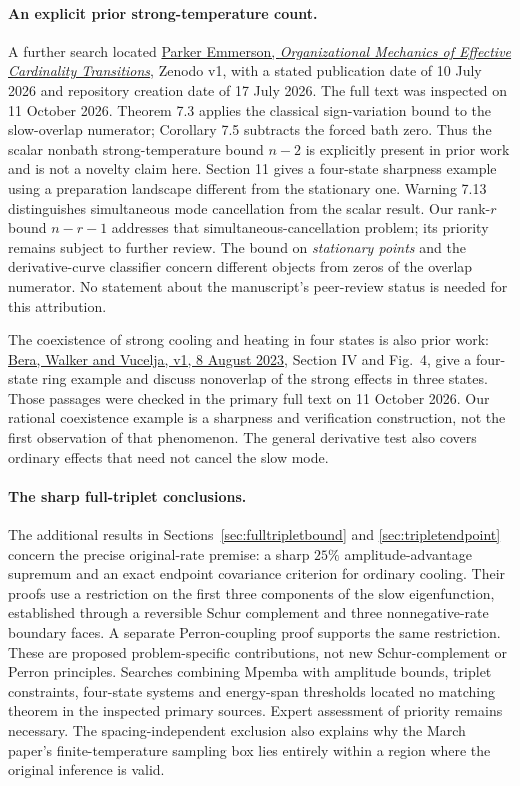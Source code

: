 \paragraph{An explicit prior strong-temperature count.}
A further search located \href{https://doi.org/10.5281/zenodo.21298061}{Parker
Emmerson, \emph{Organizational Mechanics of Effective Cardinality Transitions}},
Zenodo v1, with a stated publication date of 10 July 2026 and repository creation
date of 17 July 2026. The full text was inspected on 11 October 2026.
Theorem 7.3 applies the classical sign-variation bound to the slow-overlap
numerator; Corollary 7.5 subtracts the forced bath zero. Thus the scalar
nonbath strong-temperature bound $n-2$ is explicitly present in prior work
and is not a novelty claim here. Section 11 gives a four-state sharpness example
using a preparation landscape different from the stationary one. Warning 7.13
distinguishes simultaneous mode cancellation from the scalar result.
Our rank-$r$ bound $n-r-1$ addresses that simultaneous-cancellation problem;
its priority remains subject to further review. The bound on \emph{stationary
points} and the derivative-curve classifier concern different objects from
zeros of the overlap numerator. No statement about the manuscript's peer-review
status is needed for this attribution.

The coexistence of strong cooling and heating in four states is also prior
work: \href{https://arxiv.org/abs/2308.04557v1}{Bera, Walker and Vucelja,
v1, 8 August 2023}, Section IV and Fig.~4, give a four-state ring example and
discuss nonoverlap of the strong effects in three states. Those passages
were checked in the primary full text on 11 October 2026. Our rational
coexistence example is a sharpness and verification construction, not the
first observation of that phenomenon. The general derivative test also
covers ordinary effects that need not cancel the slow mode.

\paragraph{The sharp full-triplet conclusions.}
The additional results in Sections~\ref{sec:fulltripletbound} and
\ref{sec:tripletendpoint} concern the precise original-rate premise:
a sharp $25\%$ amplitude-advantage supremum and an exact endpoint covariance
criterion for ordinary cooling. Their proofs use a restriction on the first
three components of the slow eigenfunction, established through a reversible
Schur complement and three nonnegative-rate boundary faces. A separate
Perron-coupling proof supports the same restriction. These are proposed
problem-specific contributions, not new Schur-complement or Perron principles.
Searches combining Mpemba with amplitude bounds, triplet constraints,
four-state systems and energy-span thresholds located no matching theorem
in the inspected primary sources. Expert assessment of priority remains
necessary. The spacing-independent exclusion also explains why the March
paper's finite-temperature sampling box lies entirely within a region where
the original inference is valid.
